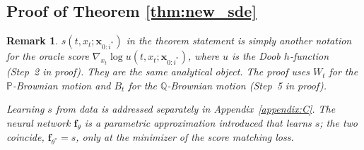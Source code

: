 \documentclass{article}
\newcommand{\PP}{\mathbb{P}}
\newcommand{\QQ}{\mathbb{Q}}
\newtheorem{remark}{Remark}
\begin{document}
\subsection{Proof of Theorem \ref{thm:new_sde}} \label{sec:proof_thm_1}
\begin{remark}
    $s(t,x_t;\mathbf{x}_{0:i^*})$ in the theorem statement is simply another notation for the oracle score
$\nabla_{x_t}\log u(t,x_t;\mathbf{x}_{0:i^*})$, where $u$ is the Doob
$h$-function (Step~2 in proof).  They are the same analytical object. The proof uses $W_t$ for the
$\PP$-Brownian motion and $B_t$ for the $\QQ$-Brownian motion (Step~5 in proof).

Learning $s$ from data is addressed separately in
Appendix~\ref{appendix:C}. The neural network $\mathbf{f}_\theta$ is a parametric approximation introduced that learns $s$; the two
coincide, $\mathbf{f}_{\theta^*}=s$, only at the minimizer of the score matching
loss.
\end{remark}
\end{document}
